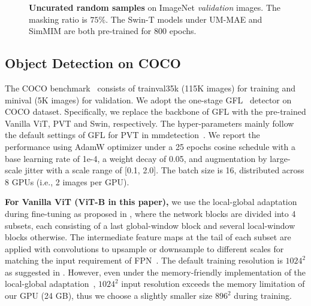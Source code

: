 \documentclass{article}
\begin{document}
\begin{figure}[t]
	\vspace{0pt}
	\begin{center}
		\setlength{\fboxrule}{0pt}
	\end{center}	
	\vspace{-14pt}
	\caption{\textbf{Uncurated random samples} on ImageNet \textit{validation} images. The masking ratio is $75\%$. The Swin-T models under UM-MAE and SimMIM are both pre-trained for 800 epochs.
	}
	\label{fig_sm_more_visual_cropped}
	\vspace{-4pt}
\end{figure}

\subsection{Object Detection on COCO}
The COCO benchmark~\cite{lin2014microsoft} consists of  trainval35k (115K images) for training and minival (5K images) for validation. We adopt the one-stage GFL~\cite{li2020generalized} detector on COCO dataset. Specifically, we replace the backbone of GFL with the pre-trained Vanilla ViT, PVT and Swin, respectively. The hyper-parameters mainly follow the default settings of GFL for PVT in mmdetection~\cite{chen2019mmdetection}. We report the performance using AdamW optimizer under a 25 epochs cosine schedule with a base learning rate of 1e-4, a weight decay of 0.05, and augmentation by large-scale jitter with a scale range of [0.1, 2.0]. The batch size is 16, distributed across 8 GPUs (i.e., 2 images per GPU).

\textbf{For Vanilla ViT (ViT-B in this paper),} we use the local-global adaptation during fine-tuning as proposed in \cite{li2021benchmarking}, where the network blocks are divided into 4 subsets, each consisting of a last global-window block and several local-window blocks otherwise. The intermediate feature maps at the tail of each subset are applied with convolutions to upsample or downsample to different scales for matching the input requirement of FPN~\cite{lin2017feature}. The default training resolution is $1024^2$ as suggested in \cite{li2021benchmarking,li2022exploring}. However, even under the memory-friendly implementation of the local-global adaptation~\cite{li2021benchmarking}, $1024^2$ input resolution exceeds the memory limitation of our GPU (24 GB), thus we choose a slightly smaller size $896^2$ during training. 
\end{document}
